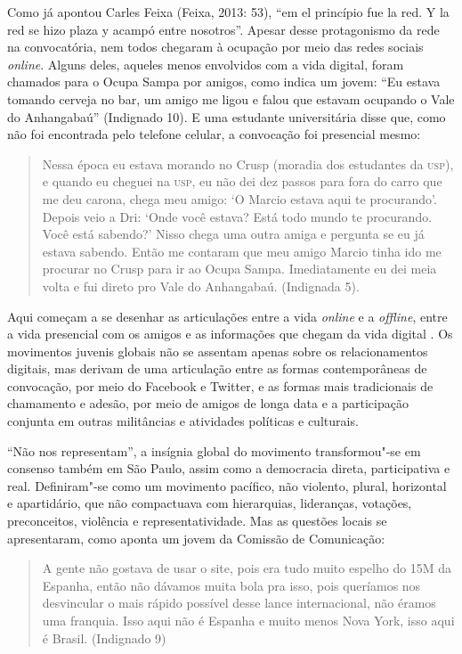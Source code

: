 Como já apontou Carles Feixa (Feixa, 2013: 53), ``em el princípio fue la
red. Y la red se hizo plaza y acampó entre nosotros''. Apesar desse
protagonismo da rede na convocatória, nem todos chegaram à ocupação por
meio das redes sociais \emph{online}. Alguns deles, aqueles menos
envolvidos com a vida digital, foram chamados para o Ocupa Sampa por
amigos, como indica um jovem: ``Eu estava tomando cerveja no bar, um
amigo me ligou e falou que estavam ocupando o Vale do Anhangabaú''
(Indignado 10). E uma estudante universitária disse que, como não foi
encontrada pelo telefone celular, a convocação foi presencial mesmo:

\begin{quote}
Nessa época eu estava morando no Crusp (moradia dos estudantes da \textsc{usp}),
e quando eu cheguei na \textsc{usp}, eu não dei dez passos para fora do carro que
me deu carona, chega meu amigo: `O Marcio estava aqui te procurando'.
Depois veio a Dri: `Onde você estava? Está todo mundo te procurando.
Você está sabendo?' Nisso chega uma outra amiga e pergunta se eu já
estava sabendo. Então me contaram que meu amigo Marcio tinha ido me
procurar no Crusp para ir ao Ocupa Sampa. Imediatamente eu dei meia
volta e fui direto pro Vale do Anhangabaú. (Indignada 5).
\end{quote}

Aqui começam a se desenhar as articulações entre a vida \emph{online} e
a \emph{offline}, entre a vida presencial com os amigos e as
informações que chegam da vida digital . Os movimentos juvenis globais
não se assentam apenas sobre os relacionamentos digitais, mas derivam de
uma articulação entre as formas contemporâneas de convocação, por meio
do Facebook e Twitter, e as formas mais tradicionais de chamamento e
adesão, por meio de amigos de longa data e a participação conjunta em
outras militâncias e atividades políticas e culturais.

``Não nos representam'', a insígnia global do movimento transformou"-se
em consenso também em São Paulo, assim como a democracia direta,
participativa e real. Definiram"-se como um movimento pacífico, não
violento, plural, horizontal e apartidário, que não compactuava com
hierarquias, lideranças, votações, preconceitos, violência e
representatividade. Mas as questões locais se apresentaram, como aponta
um jovem da Comissão de Comunicação:

\begin{quote}
A gente não gostava de usar o site, pois era tudo muito espelho do 15M
da Espanha, então não dávamos muita bola pra isso, pois queríamos nos
desvincular o mais rápido possível desse lance internacional, não éramos
uma franquia. Isso aqui não é Espanha e muito menos Nova York, isso aqui
é Brasil. (Indignado 9)
\end{quote}

